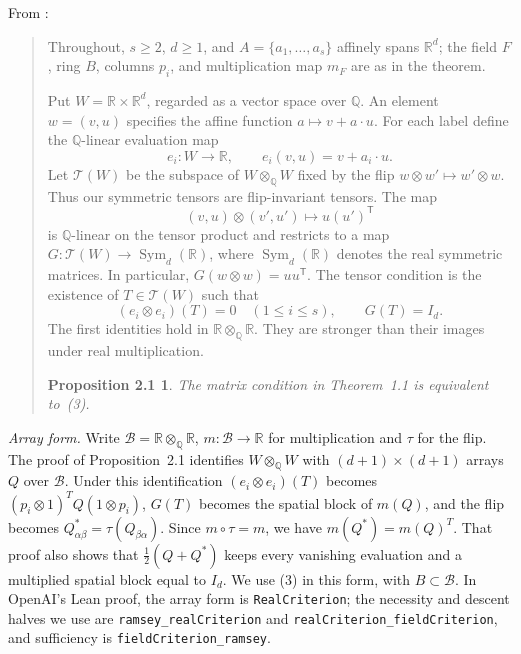 \documentclass[11pt]{amsart}
\newcommand{\Q}{\mathbb{Q}}
\newcommand{\R}{\mathbb{R}}
\DeclareMathOperator{\Sym}{Sym}
\theoremstyle{plain}
\newtheorem*{oaiprop}{Proposition 2.1}
\theoremstyle{definition}
\begin{document}
\noindent From \cite[\S2]{OAI172}:

{\small
\begin{quote}
Throughout, $s\geq2$, $d\geq1$, and
$A=\{a_1,\ldots,a_s\}$ affinely spans $\R^d$; the field $F$, ring $B$,
columns $p_i$, and multiplication map $m_F$ are as in the theorem.

Put $W=\R\times\R^d$, regarded as a vector space over $\Q$.
An element $w=(v,u)$ specifies the affine function $a\mapsto v+a\cdot u$.
For each label define the $\Q$-linear evaluation map
\[
 e_i:W\longrightarrow\R,\qquad e_i(v,u)=v+a_i\cdot u.
\]
Let $\mathcal T(W)$ be the subspace of $W\otimes_{\Q}W$ fixed by the
flip $w\otimes w'\mapsto w'\otimes w$.  Thus our symmetric tensors are
flip-invariant tensors.  The map
\[
 (v,u)\otimes(v',u')\longmapsto u(u')^{\mathsf T}
\]
is $\Q$-linear on the tensor product and restricts to a map
$G:\mathcal T(W)\to\Sym_d(\R)$, where $\Sym_d(\R)$ denotes the real
symmetric matrices.  In particular, $G(w\otimes w)=uu^{\mathsf T}$.
The tensor condition is the existence of $T\in\mathcal T(W)$ such that
\begin{equation}
 (e_i\otimes e_i)(T)=0\quad(1\leq i\leq s),
 \qquad G(T)=I_d.\tag{3}
\end{equation}
The first identities hold in $\R\otimes_{\Q}\R$.
They are stronger than their images under real multiplication.

\begin{oaiprop}
The matrix condition in Theorem~1.1 is equivalent
to~(3).
\end{oaiprop}
\end{quote}
}

\noindent\emph{Array form.} Write $\mathscr B=\R\otimes_\Q\R$, $m:\mathscr B\to\R$ for
multiplication and $\tau$ for the flip. The proof of Proposition~2.1 identifies
$W\otimes_\Q W$ with $(d+1)\times(d+1)$ arrays $Q$ over $\mathscr B$. Under this identification
$(e_i\otimes e_i)(T)$ becomes $(p_i\otimes1)^TQ(1\otimes p_i)$, $G(T)$ becomes the spatial block of
$m(Q)$, and the flip becomes $Q^*_{\alpha\beta}=\tau(Q_{\beta\alpha})$. Since $m\circ\tau=m$, we
have $m(Q^*)=m(Q)^T$. That proof also shows that $\tfrac12(Q+Q^*)$ keeps every vanishing
evaluation and a multiplied spatial block equal to $I_d$. We use (3) in this form, with
$B\subset\mathscr B$. In OpenAI's Lean proof, the array form is \texttt{RealCriterion}; the
necessity and descent halves we use are \texttt{ramsey\_realCriterion} and
\texttt{realCriterion\_fieldCriterion}, and sufficiency is \texttt{fieldCriterion\_ramsey}.
\end{document}
